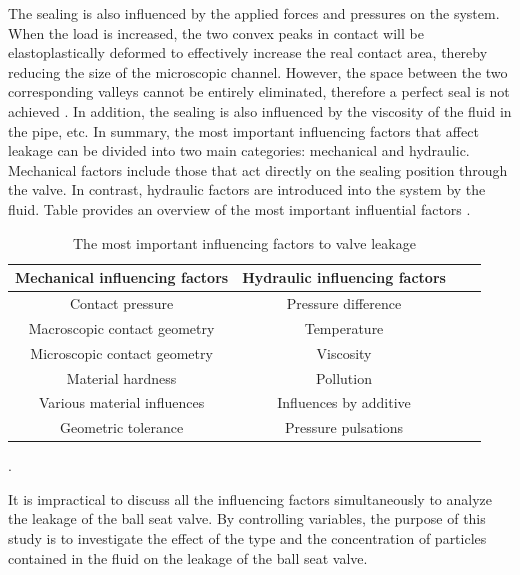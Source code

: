  The sealing is also influenced by the applied forces and pressures on the system. When the load is increased,
  the two convex peaks in contact will be elastoplastically deformed to effectively increase the real contact area, 
  thereby reducing the size of the microscopic channel. However, the space between 
 the two corresponding valleys cannot be entirely eliminated, therefore a perfect seal is not achieved \cite{Sealing2}.
 In addition, the sealing is also influenced by the viscosity of the fluid in the pipe, etc. 
 In summary, the most important influencing factors that affect leakage can be divided into two main 
 categories: mechanical and hydraulic. Mechanical factors include those that act directly on the sealing 
 position through the valve. In contrast, hydraulic factors are introduced into 
 the system by the fluid. Table  provides an overview of the most 
 important influential factors \cite{PhD-M.S}.


    \begin{table}[h!]
        \centering
        \begin{tabular}{|c| c |c |c|} 
         \hline
         Mechanical influencing factors & Hydraulic influencing factors  \\ [0.5ex] 
         \hline
         Contact pressure  & Pressure difference  \\ 
         Macroscopic contact geometry & Temperature  \\
         Microscopic contact geometry & Viscosity \\
         Material hardness & Pollution \\
         Various material influences & Influences by additive \\
         Geometric tolerance & Pressure pulsations\\[1ex] 
         \hline
        \end{tabular}
        \caption{The most important influencing factors to valve leakage \cite{PhD-M.S}}.
        \label{tab:influencing factors to valve}
        \end{table}

        It is impractical to discuss all the influencing factors simultaneously to analyze 
        the leakage of the ball seat valve. By controlling variables, the purpose of this study
         is to investigate the effect of the type and the 
        concentration of particles contained in the fluid on the leakage of the ball seat valve.